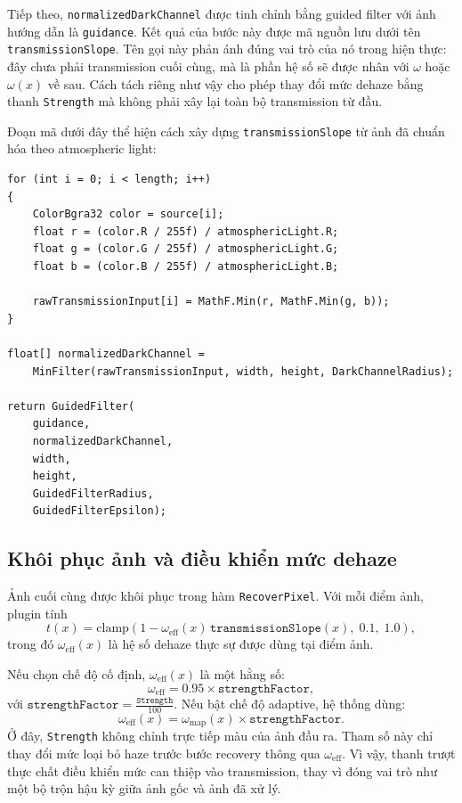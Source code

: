 Tiếp theo, \texttt{normalizedDarkChannel} được tinh chỉnh bằng guided filter với ảnh hướng dẫn là \texttt{guidance}. Kết quả của bước này được mã nguồn lưu dưới tên \texttt{transmissionSlope}. Tên gọi này phản ánh đúng vai trò của nó trong hiện thực: đây chưa phải transmission cuối cùng, mà là phần hệ số sẽ được nhân với \(\omega\) hoặc \(\omega(x)\) về sau. Cách tách riêng như vậy cho phép thay đổi mức dehaze bằng thanh \texttt{Strength} mà không phải xây lại toàn bộ transmission từ đầu.

Đoạn mã dưới đây thể hiện cách xây dựng \texttt{transmissionSlope} từ ảnh đã chuẩn hóa theo atmospheric light:

\begin{lstlisting}[style=csharpblock,caption={Trích đoạn dựng transmissionSlope từ ảnh đã chuẩn hóa theo atmospheric light}]
for (int i = 0; i < length; i++)
{
    ColorBgra32 color = source[i];
    float r = (color.R / 255f) / atmosphericLight.R;
    float g = (color.G / 255f) / atmosphericLight.G;
    float b = (color.B / 255f) / atmosphericLight.B;

    rawTransmissionInput[i] = MathF.Min(r, MathF.Min(g, b));
}

float[] normalizedDarkChannel =
    MinFilter(rawTransmissionInput, width, height, DarkChannelRadius);

return GuidedFilter(
    guidance,
    normalizedDarkChannel,
    width,
    height,
    GuidedFilterRadius,
    GuidedFilterEpsilon);
\end{lstlisting}

\subsection{Khôi phục ảnh và điều khiển mức dehaze}

Ảnh cuối cùng được khôi phục trong hàm \texttt{RecoverPixel}. Với mỗi điểm ảnh, plugin tính
\begin{equation}
t(x)=\mathrm{clamp}\left(1-\omega_{\text{eff}}(x)\,\texttt{transmissionSlope}(x),\; 0.1,\; 1.0\right),
\end{equation}
trong đó \(\omega_{\text{eff}}(x)\) là hệ số dehaze thực sự được dùng tại điểm ảnh.

Nếu chọn chế độ cố định, \(\omega_{\text{eff}}(x)\) là một hằng số:
\[
\omega_{\text{eff}} = 0.95 \times \texttt{strengthFactor},
\]
với \(\texttt{strengthFactor} = \frac{\texttt{Strength}}{100}\). Nếu bật chế độ adaptive, hệ thống dùng:
\[
\omega_{\text{eff}}(x)=\omega_{\mathrm{map}}(x)\times \texttt{strengthFactor}.
\]
Ở đây, \texttt{Strength} không chỉnh trực tiếp màu của ảnh đầu ra. Tham số này chỉ thay đổi mức loại bỏ haze trước bước recovery thông qua \(\omega_{\text{eff}}\). Vì vậy, thanh trượt thực chất điều khiển mức can thiệp vào transmission, thay vì đóng vai trò như một bộ trộn hậu kỳ giữa ảnh gốc và ảnh đã xử lý.

